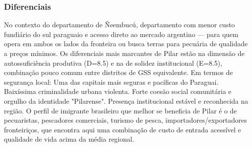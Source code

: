 \subsubsection*{Diferenciais}\label{dif-pilar-1201}
No contexto do departamento de Ñeembucú, departamento com menor custo fundiário do sul paraguaio e acesso direto ao mercado argentino — para quem opera em ambos os lados da fronteira ou busca terras para pecuária de qualidade a preços mínimos. Os diferenciais mais marcantes de Pilar estão na dimensão de autossuficiência produtiva (D=8.5) e na de solidez institucional (E=8.5), combinação pouco comum entre distritos de GSS equivalente. Em termos de segurança local: Uma das capitais mais seguras e pacíficas do Paraguai. Baixíssima criminalidade urbana violenta. Forte coesão social comunitária e orgulho da identidade "Pilarense". Presença institucional estável e reconhecida na região. O perfil de imigrante brasileiro que melhor se beneficia de Pilar é o de pecuaristas, pescadores comerciais, turismo de pesca, importadores/exportadores fronteiriços, que encontra aqui uma combinação de custo de entrada acessível e qualidade de vida acima da média regional.
